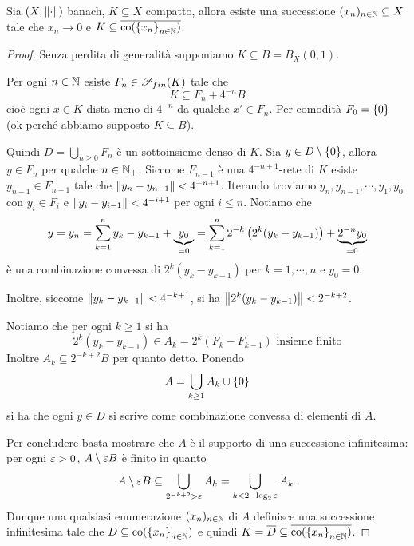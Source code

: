 \begin{theorem}[Dieudonn\'e]\label{ThDieudonne}
Sia $(X,{\left\Vert{\cdot}\right\Vert})$ banach, $K\subseteq X$ compatto, allora esiste una successione $(x_n)_{n\in\mathbb{N}}\subseteq X$ tale che $x_n\to 0$ e $K\subseteq \overline{\operatorname{co}(\left\{{x_n}\right\}_{n\in\mathbb{N}})}$.
\end{theorem}
\begin{proof}
Senza perdita di generalit\`a supponiamo $K\subseteq B=B_X(0,1)$.

Per ogni $n\in\mathbb{N}$ esiste $F_n\in\mathscr{P}_{fin}(K)$ tale che 
\[K\subseteq F_n+4^{-n}B\]
cio\`e ogni $x\in K$ dista meno di $4^{-n}$ da qualche $x'\in F_n$. Per comodit\`a $F_0=\left\{{0}\right\}$ (ok perch\'e abbiamo supposto $K\subseteq B$).

Quindi $D=\bigcup_{n\geq 0}F_n$ \`e un sottoinsieme denso di $K$. Sia $y\in D\setminus\{0\}$, allora $y\in F_n$ per qualche $n\in\mathbb{N}_+$. Siccome $F_{n-1}$ \`e una $4^{-n+1}$-rete di $K$ esiste $y_{n-1}\in F_{n-1}$ tale che $\left\Vert{y_n-y_{n-1}}\right\Vert<4^{-n+1}$. Iterando troviamo $y_n,y_{n-1},\cdots, y_1,y_0$ con $y_i\in F_i$ e $\left\Vert{y_i-y_{i-1}}\right\Vert<4^{-i+1}$ per ogni $i\leq n$. Notiamo che
\[y=y_n=\sum_{k=1}^n y_k-y_{k-1} +\underset{=0}{\underbrace{y_0}}=\sum_{k=1}^n 2^{-k}\left({2^k(y_k-y_{k-1})}\right)+\underset{=0}{\underbrace{2^{-n}y_0}}\]
\`e una combinazione convessa di $2^k(y_k-y_{k-1})$ per $k=1,\cdots, n$ e $y_0=0$.

Inoltre, siccome $\left\Vert{y_k-y_{k-1}}\right\Vert<4^{-k+1}$, si ha $\left\Vert{2^k(y_k-y_{k-1})}\right\Vert<2^{-k+2}$.

Notiamo che per ogni $k\geq 1$ si ha
\[2^k(y_k-y_{k-1})\in A_k=2^k(F_k-F_{k-1})\text{ insieme finito}\]
Inoltre $A_k\subseteq 2^{-k+2}B$ per quanto detto. Ponendo
\[A=\bigcup_{k\geq1} A_k \cup \left\{{0}\right\}\]
si ha che ogni $y\in D$ si scrive come combinazione convessa di elementi di $A$. 

Per concludere basta mostrare che $A$ \`e il supporto di una successione infinitesima:
per ogni $\varepsilon>0$, $A\setminus \varepsilon B$ \`e finito in quanto 
\[A\setminus \varepsilon B\subseteq \bigcup_{2^{-k+2}>\varepsilon}A_k=\bigcup_{k<2-\log_2\varepsilon}A_k.\]
Dunque una qualsiasi enumerazione $(x_n)_{n\in\mathbb{N}}$ di $A$ definisce una successione infinitesima tale che $D\subseteq \operatorname{co}(\left\{{x_n}\right\}_{n\in \mathbb{N}})$ e quindi $K=\overline{D}\subseteq \overline{\operatorname{co}(\left\{{x_n}\right\}_{n\in \mathbb{N}})}$.
\end{proof}

